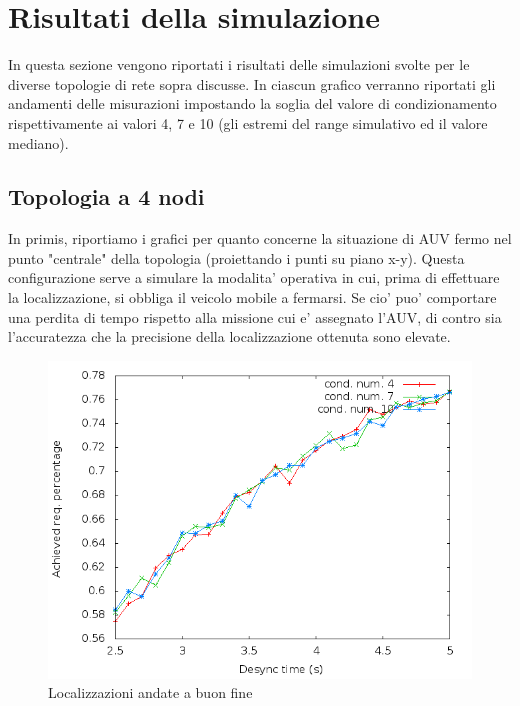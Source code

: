 \documentclass[Lau,binding=0.6cm]{sapthesis}
\begin{document}
\section{Risultati della simulazione}
In questa sezione vengono riportati i risultati delle simulazioni svolte per le diverse topologie di rete sopra discusse. In ciascun grafico verranno riportati gli andamenti delle misurazioni impostando la soglia del valore di condizionamento rispettivamente ai valori 4, 7 e 10 (gli estremi del range simulativo ed il valore mediano).  
\subsection{Topologia a 4 nodi}
In primis, riportiamo i grafici per quanto concerne la situazione di AUV fermo nel punto "centrale" della topologia (proiettando i punti su piano x-y). Questa configurazione serve a simulare la modalita' operativa in cui, prima di effettuare la localizzazione, si obbliga il veicolo mobile a fermarsi. Se cio' puo' comportare una perdita di tempo rispetto alla missione cui e' assegnato l'AUV, di contro sia l'accuratezza che la precisione della localizzazione ottenuta sono elevate.

\begin{figure}[H]
    \centering
    \includegraphics[scale=0.5]{squaresimulation/achievedlocpreempt0drop0speed0.png}
    \caption{Localizzazioni andate a buon fine}
    \label{fig:squaresimulation/achievedlocpreempt0drop0speed0}
\end{figure}
\end{document}
